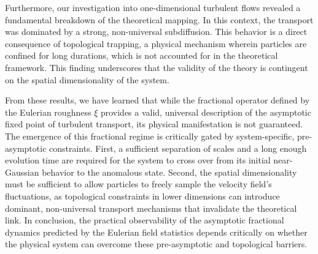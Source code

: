 \documentclass[]{article}
\begin{document}
Furthermore, our investigation into one-dimensional turbulent flows revealed a fundamental breakdown of the theoretical mapping. In this context, the transport was dominated by a strong, non-universal subdiffusion. This behavior is a direct consequence of topological trapping, a physical mechanism wherein particles are confined for long durations, which is not accounted for in the theoretical framework. This finding underscores that the validity of the theory is contingent on the spatial dimensionality of the system.

From these results, we have learned that while the fractional operator defined by the Eulerian roughness $\xi$ provides a valid, universal description of the asymptotic fixed point of turbulent transport, its physical manifestation is not guaranteed. The emergence of this fractional regime is critically gated by system-specific, pre-asymptotic constraints. First, a sufficient separation of scales and a long enough evolution time are required for the system to cross over from its initial near-Gaussian behavior to the anomalous state. Second, the spatial dimensionality must be sufficient to allow particles to freely sample the velocity field's fluctuations, as topological constraints in lower dimensions can introduce dominant, non-universal transport mechanisms that invalidate the theoretical link. In conclusion, the practical observability of the asymptotic fractional dynamics predicted by the Eulerian field statistics depends critically on whether the physical system can overcome these pre-asymptotic and topological barriers.


{}

\end{document}

